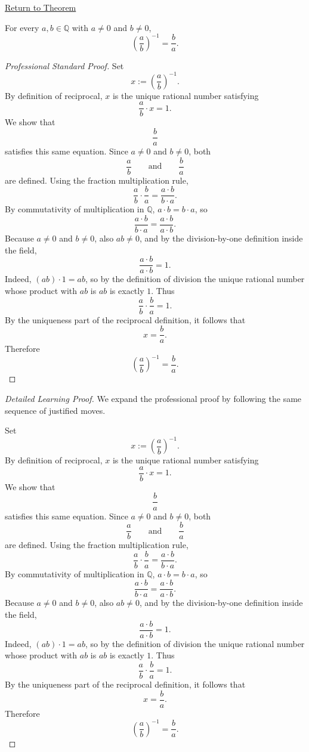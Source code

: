 \newpage
{}
\label{prf:rational-fraction-reciprocal}

\begin{remark*}[Return]
\hyperref[thm:rational-fraction-reciprocal]{Return to Theorem}
\end{remark*}

\begin{theorem*}
For every $a,b\in\mathbb{Q}$ with $a\neq 0$ and $b\neq 0$,
\[
\left(\frac{a}{b}\right)^{-1}=\frac{b}{a}.
\]
\end{theorem*}

\begin{proof}[Professional Standard Proof]
\LRAProofBodyStart
Set
\[
x:=\left(\frac{a}{b}\right)^{-1}.
\]
By definition of reciprocal, $x$ is the unique rational number satisfying
\[
\frac{a}{b}\cdot x=1.
\]
We show that
\[
\frac{b}{a}
\]
satisfies this same equation.  Since $a\neq 0$ and $b\neq 0$, both
\[
\frac{a}{b}
\qquad\text{and}\qquad
\frac{b}{a}
\]
are defined.  Using the fraction multiplication rule,
\[
\frac{a}{b}\cdot\frac{b}{a}=\frac{a\cdot b}{b\cdot a}.
\]
By commutativity of multiplication in $\mathbb{Q}$, $a\cdot b=b\cdot a$, so
\[
\frac{a\cdot b}{b\cdot a}=\frac{a\cdot b}{a\cdot b}.
\]
Because $a\neq 0$ and $b\neq 0$, also $ab\neq 0$, and by the division-by-one
definition inside the field,
\[
\frac{a\cdot b}{a\cdot b}=1.
\]
Indeed, $(ab)\cdot 1=ab$, so by the definition of division the unique
rational number whose product with $ab$ is $ab$ is exactly $1$.
Thus
\[
\frac{a}{b}\cdot\frac{b}{a}=1.
\]
By the uniqueness part of the reciprocal definition, it follows that
\[
x=\frac{b}{a}.
\]
Therefore
\[
\left(\frac{a}{b}\right)^{-1}=\frac{b}{a}.
\]
\end{proof}

\begin{proof}[Detailed Learning Proof]
\LRAProofBodyStart
We expand the professional proof by following the same sequence of justified moves.

Set
\[
x:=\left(\frac{a}{b}\right)^{-1}.
\]
By definition of reciprocal, $x$ is the unique rational number satisfying
\[
\frac{a}{b}\cdot x=1.
\]
We show that
\[
\frac{b}{a}
\]
satisfies this same equation.  Since $a\neq 0$ and $b\neq 0$, both
\[
\frac{a}{b}
\qquad\text{and}\qquad
\frac{b}{a}
\]
are defined.  Using the fraction multiplication rule,
\[
\frac{a}{b}\cdot\frac{b}{a}=\frac{a\cdot b}{b\cdot a}.
\]
By commutativity of multiplication in $\mathbb{Q}$, $a\cdot b=b\cdot a$, so
\[
\frac{a\cdot b}{b\cdot a}=\frac{a\cdot b}{a\cdot b}.
\]
Because $a\neq 0$ and $b\neq 0$, also $ab\neq 0$, and by the division-by-one
definition inside the field,
\[
\frac{a\cdot b}{a\cdot b}=1.
\]
Indeed, $(ab)\cdot 1=ab$, so by the definition of division the unique
rational number whose product with $ab$ is $ab$ is exactly $1$.
Thus
\[
\frac{a}{b}\cdot\frac{b}{a}=1.
\]
By the uniqueness part of the reciprocal definition, it follows that
\[
x=\frac{b}{a}.
\]
Therefore
\[
\left(\frac{a}{b}\right)^{-1}=\frac{b}{a}.
\]
\end{proof}

